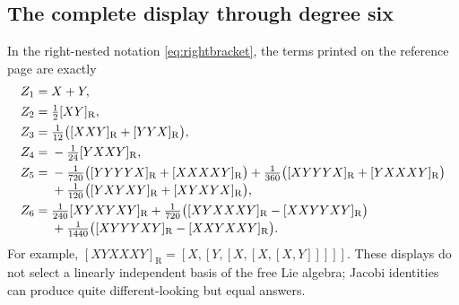 \documentclass[11pt]{article}
\numberwithin{equation}{section}
\theoremstyle{definition}
\theoremstyle{remark}
\newcommand{\RB}[1]{[#1]_{\mathrm R}}
\begin{document}
\subsection{The complete display through degree six}
In the right-nested notation \eqref{eq:rightbracket}, the terms printed
on the reference page are exactly
\begin{align}
 Z_1={}&X+Y,\label{eq:z1}\\
 Z_2={}&\tfrac12\RB{XY},\label{eq:z2}\\
 Z_3={}&\tfrac1{12}\bigl(\RB{XXY}+\RB{YYX}\bigr),\label{eq:z3}\\
 Z_4={}&-\tfrac1{24}\RB{YXXY},\label{eq:z4}\\
 Z_5={}&-\tfrac1{720}\bigl(\RB{YYYYX}+\RB{XXXXY}\bigr)
       +\tfrac1{360}\bigl(\RB{XYYYX}+\RB{YXXXY}\bigr)
       \notag\\[-2pt]
     &+\tfrac1{120}\bigl(\RB{YXYXY}+\RB{XYXYX}\bigr),
       \label{eq:z5}\\
 Z_6={}&\tfrac1{240}\RB{XYXYXY}
       +\tfrac1{720}\bigl(\RB{XYXXXY}-\RB{XXYYXY}\bigr)
       \notag\\[-2pt]
     &+\tfrac1{1440}\bigl(\RB{XYYYXY}-\RB{XXYXXY}\bigr).
       \label{eq:z6}
\end{align}
For example, $\RB{XYXXXY}=[X,[Y,[X,[X,[X,Y]]]]]$.
These displays do not select a linearly independent basis of the free
Lie algebra; Jacobi identities can produce quite different-looking
but equal answers.
\end{document}
